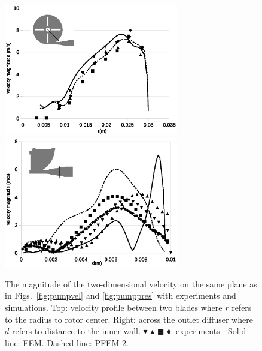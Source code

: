 \begin{figure}[htbp]
    \centering
    \includegraphics[width=3in]{imgs/nozzle_pump/pump_velblade.eps}\\
    \vspace{.5cm}
    \includegraphics[width=3in]{imgs/nozzle_pump/pump_veldiffuser.eps}
    \caption{The magnitude of the two-dimensional velocity on the same plane as in Figs.~\ref{fig:pumpvel} and \ref{fig:pumppres} with experiments and simulations. Top: velocity profile between two blades where $r$ refers to the radius to rotor center. Right: across the outlet diffuser where $d$ refers to distance to the inner wall. $\blacktriangledown$ $\blacktriangle$ $\blacksquare$ $\blacklozenge$: experiments \cite{mali_cfd}. Solid line: FEM. Dashed line: PFEM-2. }
    \label{fig:pumpvelprofile}
\end{figure}
